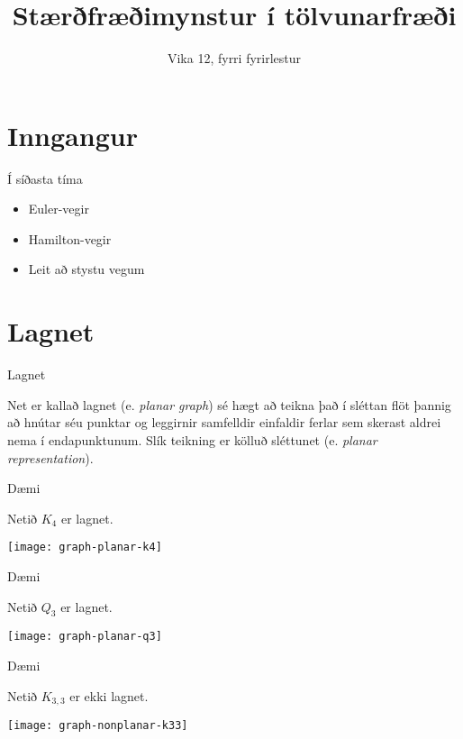 \documentclass[handout]{beamer}
\title{Stærðfræðimynstur í tölvunarfræði}
\subtitle{Vika 12, fyrri fyrirlestur}
\begin{document}
\begin{frame}
\titlepage
\end{frame}


\section{Inngangur}

\begin{frame}{Í síðasta tíma}
\begin{itemize}
 \item Euler-vegir
 \item Hamilton-vegir
 \item Leit að stystu vegum
\end{itemize}
\end{frame}

\section{Lagnet}

\begin{frame}{Lagnet}
\begin{tcolorbox}[title=Lagnet]
Net er kallað lagnet (e. \emph{planar graph}) sé hægt að teikna það í sléttan flöt þannig að hnútar séu punktar og leggirnir samfelldir einfaldir ferlar sem skerast aldrei nema í endapunktunum. Slík teikning er kölluð sléttunet (e. \emph{planar representation}).
\end{tcolorbox}
\end{frame}

\begin{frame}{Dæmi}
\begin{center}
Netið $K_4$ er lagnet.

\texttt{[image: graph-planar-k4]}
\end{center}
\end{frame}

\begin{frame}{Dæmi}
\begin{center}
Netið $Q_3$ er lagnet.

\texttt{[image: graph-planar-q3]}
\end{center}
\end{frame}

\begin{frame}{Dæmi}
\begin{center}
Netið $K_{3,3}$ er ekki lagnet.

\texttt{[image: graph-nonplanar-k33]}
\end{center}
\end{frame}
\end{document}
